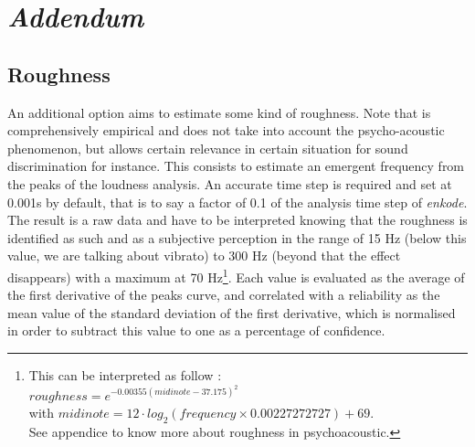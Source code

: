 \section{\textit{Addendum}}
\subsection*{Roughness}

An additional option aims to estimate some kind of roughness. Note that is comprehensively empirical and does not take into account the psycho-acoustic phenomenon, but allows certain relevance in certain situation for sound discrimination for instance. This consists to estimate an emergent frequency from the peaks of the loudness analysis. An accurate time step is required and set at 0.001s by default, that is to say a factor of 0.1 of the analysis time step of \textsl{enkode}. The result is a raw data and have to be interpreted knowing that the roughness is identified as such and as a subjective perception in the range of 15 Hz (below this value, we are talking about vibrato) to 300 Hz (beyond that the effect disappears) with a maximum at 70 Hz\footnote{This can be interpreted as follow :\\\indent \quad $roughness = e^{-0.00355 (midinote-37.175)^2}$\\ \indent \quad with $midinote=12 \cdot log_2(frequency \times 0.00227272727) + 69$.\\\indent See appendice  to know more about roughness in psychoacoustic.}. Each value is evaluated as the average of the first derivative of the peaks curve, and correlated with a reliability as the mean value of the standard deviation of the first derivative, which is normalised in order to subtract this value to one as a percentage of confidence.
